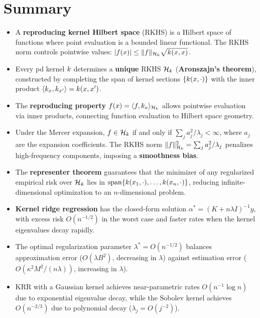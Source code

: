 \documentclass[11pt,a4paper]{article}
\begin{document}

\section{Summary}
\label{sec:summary}

\begin{itemize}
    \item A \textbf{reproducing kernel Hilbert space} (RKHS) is a
    Hilbert space of functions where point evaluation is a bounded
    linear functional. The RKHS norm controls pointwise values:
    $|f(x)| \le \|f\|_{\mathcal{H}_k} \sqrt{k(x,x)}$.

    \item Every pd kernel $k$ determines a \textbf{unique}
    RKHS $\mathcal{H}_k$ (\textbf{Aronszajn's theorem}), constructed by
    completing the span of kernel sections $\{k(x, \cdot)\}$
    with the inner product $\langle k_x, k_{x'}
    \rangle = k(x, x')$.

    \item The \textbf{reproducing property} $f(x) = \langle f,
    k_x \rangle_{\mathcal{H}_k}$ allows pointwise evaluation via
    inner products, connecting function evaluation to Hilbert space
    geometry.

    \item Under the Mercer expansion, $f \in \mathcal{H}_k$ if and only if
    $\sum_j a_j^2 / \lambda_j < \infty$, where $a_j$ are the
    expansion coefficients. The RKHS norm $\|f\|_{\mathcal{H}_k}^2 =
    \sum_j a_j^2 / \lambda_j$ penalizes high-frequency
    components, imposing a \textbf{smoothness bias}.

    \item The \textbf{representer theorem} guarantees that the
    minimizer of any regularized empirical risk over $\mathcal{H}_k$ lies
    in $\operatorname{span}\{k(x_1, \cdot), \ldots, k(x_n, \cdot)\}$,
    reducing infinite-dimensional optimization to an $n$-dimensional
    problem.

    \item \textbf{Kernel ridge regression} has the closed-form
    solution $\alpha^* = (K + n\lambda I)^{-1} y$, with excess
    risk $O(n^{-1/2})$ in the worst case and faster rates when
    the kernel eigenvalues decay rapidly.

    \item The optimal regularization parameter $\lambda^* =
    O(n^{-1/2})$ balances approximation error ($O(\lambda B^2)$,
    decreasing in $\lambda$) against estimation error
    ($O(\kappa^2 M^2 / (n\lambda))$, increasing in $\lambda$).

    \item KRR with a Gaussian kernel achieves near-parametric
    rates $O(n^{-1} \log n)$ due to exponential eigenvalue decay,
    while the Sobolev kernel achieves $O(n^{-2/3})$ due to
    polynomial decay ($\lambda_j = O(j^{-2})$).
\end{itemize}
\end{document}
